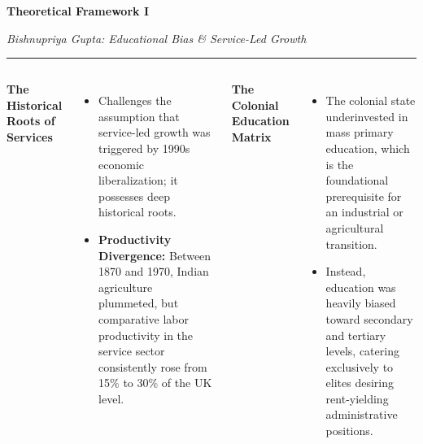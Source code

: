 \documentclass[aspectratio=169, 10pt]{beamer}
\newcommand{\slidetitlesub}[2]{%
  \vspace{-4pt}%
  {\usebeamerfont{frametitle}\Large\color{ink}\textbf{#1}}%
  \par\vspace{1pt}%
  {\small\color{slate}\textit{#2}}%
  \par\vspace{2pt}%
  {\color{clay}\rule{40pt}{2pt}}%
  \par\vspace{8pt}%
}
\begin{document}
\begin{frame}
\slidetitlesub{Theoretical Framework I}{Bishnupriya Gupta: Educational Bias \& Service-Led Growth}

\begin{columns}[T]
{\bfseries\color{ink}The Historical Roots of Services}
\begin{itemize}
  \item Challenges the assumption that service-led growth was triggered by 1990s economic liberalization; it possesses deep historical roots.
  \item \textbf{Productivity Divergence:} Between 1870 and 1970, Indian agriculture plummeted, but comparative labor productivity in the service sector consistently rose from 15\% to 30\% of the UK level.
\end{itemize}

{\bfseries\color{ink}The Colonial Education Matrix}
\begin{itemize}
  \item The colonial state underinvested in mass primary education, which is the foundational prerequisite for an industrial or agricultural transition.
  \item Instead, education was heavily biased toward secondary and tertiary levels, catering exclusively to elites desiring rent-yielding administrative positions.
\end{itemize}
\end{columns}
\end{frame}

\end{document}
